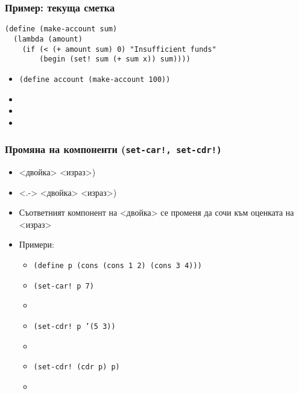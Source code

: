 \documentclass{beamer}
\begin{document}
\begin{frame}[fragile]
  \frametitle{Пример: текуща сметка}

\begin{verbatim}
(define (make-account sum)
  (lambda (amount)
    (if (< (+ amount sum) 0) "Insufficient funds"
        (begin (set! sum (+ sum x)) sum))))
\end{verbatim}
  \onslide<+->
  \begin{itemize}[<+->]
  \item \tt{(define account (make-account 100))}
  \item {}
  \item {}
  \item {}
  \end{itemize}
\end{frame}

\begin{frame}
  \frametitle{Промяна на компоненти (\tt{set-car!}, \tt{set-cdr!})}
  \begin{itemize}[<+->]
  \item {}<двойка> <израз>\tta)
  \item<.-> <двойка> <израз>\tta)
  \item Съответният компонент на <двойка> се променя да сочи към оценката на <израз>
  \item Примери:
    \begin{itemize}
    \item \tt{(define p (cons (cons 1 2) (cons 3 4)))}
    \item \tt{(set-car! p 7)}
    \item {}
    \item \tt{(set-cdr! p '(5 3))}
    \item {}
    \item \tt{(set-cdr! (cdr p) p)}
    \item {}
    \end{itemize}
  \end{itemize}
\end{frame}
\end{document}
